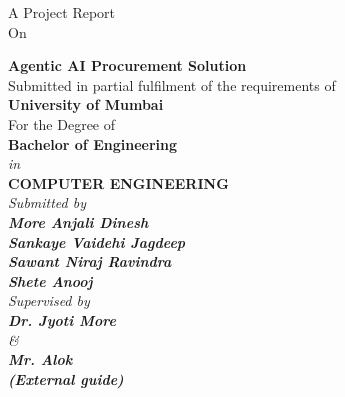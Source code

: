
\begin{titlepage}
\thispagestyle{empty}

{\centering
{A Project Report}\\ 
\vspace{0.2cm}
{On}
\vspace{0.3cm}
\\
}
 
{\centering
\large

{\LARGE\bf Agentic AI Procurement Solution}\\
\vspace{1cm}
{Submitted in partial fulfilment of the requirements of } \\
\vspace{0.2cm}
{\bf{University of Mumbai}} \\
\vspace{0.2cm}
{For the Degree of} \\
\vspace{0.2cm}
{\bf {Bachelor of Engineering }} \\
{\it{in}} \\
{\bf COMPUTER ENGINEERING } \\
\vspace{0.5cm}
\it{Submitted by} \\
\vspace{.2cm}
\rm
{\large \bf {More Anjali Dinesh}}\\
{\large \bf {Sankaye Vaidehi Jagdeep}}\\
{\large \bf {Sawant Niraj Ravindra}}\\
{\large \bf {Shete Anooj  }}\\

\vspace{0.8 cm}
{\it{Supervised by}} \\
\vspace{.1cm}
\hspace{.05cm} {\large \textbf {Dr. Jyoti More}}\\
\vspace{0.1cm}
{\it{\&}} \\
\vspace{.1cm}
\hspace{.02cm} {\large \textbf {Mr. Alok}}\\
\vspace{.05cm}
\hspace{.01cm} {\large \textbf {(External guide)}}\\


}
\end{titlepage}
